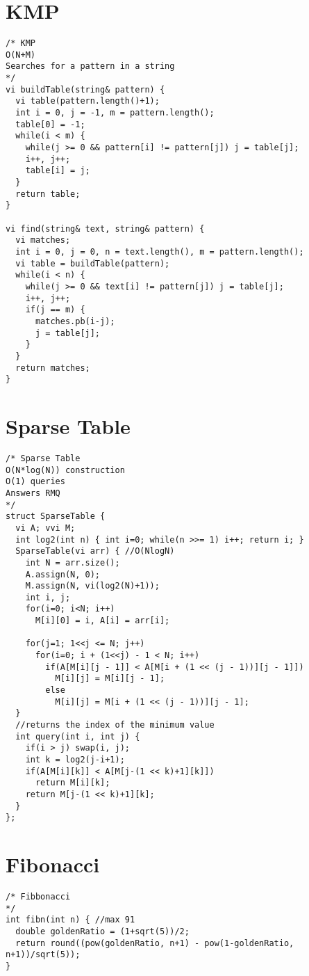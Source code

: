 \documentclass[8pt, oneside]{extarticle}
\begin{document}
\begin{multicols}{3}
\section{KMP}


\begin{lstlisting}
/* KMP
O(N+M)
Searches for a pattern in a string
*/
vi buildTable(string& pattern) {
  vi table(pattern.length()+1);
  int i = 0, j = -1, m = pattern.length();
  table[0] = -1;
  while(i < m) {
    while(j >= 0 && pattern[i] != pattern[j]) j = table[j];
    i++, j++;
    table[i] = j;
  }
  return table;
}

vi find(string& text, string& pattern) {
  vi matches;
  int i = 0, j = 0, n = text.length(), m = pattern.length();
  vi table = buildTable(pattern);
  while(i < n) {
    while(j >= 0 && text[i] != pattern[j]) j = table[j];
    i++, j++;
    if(j == m) {
      matches.pb(i-j);
      j = table[j];
    }
  }
  return matches;
}
\end{lstlisting}

\section{Sparse Table}

\begin{lstlisting}
/* Sparse Table
O(N*log(N)) construction
O(1) queries
Answers RMQ
*/
struct SparseTable {
  vi A; vvi M;
  int log2(int n) { int i=0; while(n >>= 1) i++; return i; }
  SparseTable(vi arr) { //O(NlogN)
    int N = arr.size();
    A.assign(N, 0);
    M.assign(N, vi(log2(N)+1));
    int i, j;
    for(i=0; i<N; i++)
      M[i][0] = i, A[i] = arr[i];

    for(j=1; 1<<j <= N; j++)
      for(i=0; i + (1<<j) - 1 < N; i++)
        if(A[M[i][j - 1]] < A[M[i + (1 << (j - 1))][j - 1]])
          M[i][j] = M[i][j - 1];
        else
          M[i][j] = M[i + (1 << (j - 1))][j - 1];
  }
  //returns the index of the minimum value
  int query(int i, int j) {
    if(i > j) swap(i, j);
    int k = log2(j-i+1);
    if(A[M[i][k]] < A[M[j-(1 << k)+1][k]])
      return M[i][k];
    return M[j-(1 << k)+1][k];
  }
};
\end{lstlisting}

\section{Fibonacci}

\begin{lstlisting}
/* Fibbonacci
*/
int fibn(int n) { //max 91
  double goldenRatio = (1+sqrt(5))/2;
  return round((pow(goldenRatio, n+1) - pow(1-goldenRatio, n+1))/sqrt(5));
}


\end{lstlisting}
\end{multicols}
\end{document}
